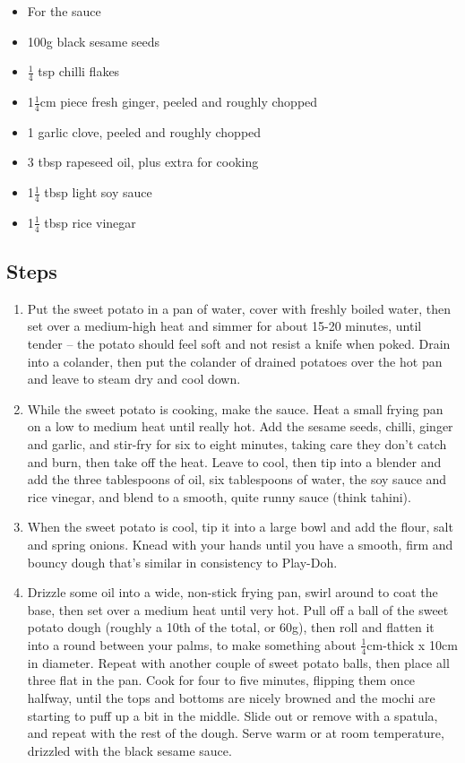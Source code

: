 \documentclass{book}
\begin{document}
\begin{itemize}
\item For the sauce
\item 100g black sesame seeds
\item $\frac{1}{4}$ tsp chilli flakes
\item 1$\frac{1}{4}$cm piece fresh ginger, peeled and roughly chopped
\item 1 garlic clove, peeled and roughly chopped
\item 3 tbsp rapeseed oil, plus extra for cooking
\item 1$\frac{1}{4}$ tbsp light soy sauce
\item 1$\frac{1}{4}$ tbsp rice vinegar
\end{itemize}

\subsection*{Steps}
\begin{enumerate}
\item Put the sweet potato in a pan of water, cover with freshly boiled water, then set over a medium-high heat and simmer for about 15-20 minutes, until tender – the potato should feel soft and not resist a knife when poked. Drain into a colander, then put the colander of drained potatoes over the hot pan and leave to steam dry and cool down.
\item While the sweet potato is cooking, make the sauce. Heat a small frying pan on a low to medium heat until really hot. Add the sesame seeds, chilli, ginger and garlic, and stir-fry for six to eight minutes, taking care they don’t catch and burn, then take off the heat. Leave to cool, then tip into a blender and add the three tablespoons of oil, six tablespoons of water, the soy sauce and rice vinegar, and blend to a smooth, quite runny sauce (think tahini).
\item When the sweet potato is cool, tip it into a large bowl and add the flour, salt and spring onions. Knead with your hands until you have a smooth, firm and bouncy dough that’s similar in consistency to Play-Doh.
\item Drizzle some oil into a wide, non-stick frying pan, swirl around to coat the base, then set over a medium heat until very hot. Pull off a ball of the sweet potato dough (roughly a 10th of the total, or 60g), then roll and flatten it into a round between your palms, to make something about $\frac{1}{4}$cm-thick x 10cm in diameter. Repeat with another couple of sweet potato balls, then place all three flat in the pan. Cook for four to five minutes, flipping them once halfway, until the tops and bottoms are nicely browned and the mochi are starting to puff up a bit in the middle. Slide out or remove with a spatula, and repeat with the rest of the dough. Serve warm or at room temperature, drizzled with the black sesame sauce.
\end{enumerate}
\newpage
\end{document}
